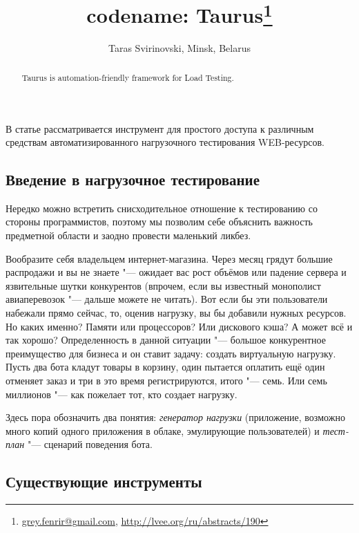 \documentclass[10pt, a5paper]{article}
\begin{document}
\title{codename: Taurus\footnote{\url{grey.fenrir@gmail.com}, \url{http://lvee.org/ru/abstracts/190}}}
\author{Taras Svirinovski, Minsk, Belarus}
\maketitle
\begin{abstract}
Taurus is automation-friendly framework for Load Testing.
\end{abstract}
В статье рассматривается инструмент для простого доступа к различным средствам автоматизированного нагрузочного тестирования WEB-ресурсов.

\subsection*{Введение в нагрузочное тестирование}
Нередко можно встретить снисходительное отношение к тестированию со стороны программистов, поэтому мы позволим себе объяснить важность предметной области и заодно провести маленький ликбез.

Вообразите себя владельцем интернет-магазина. Через месяц грядут большие распродажи и вы не знаете "--- ожидает вас рост объёмов или падение сервера и язвительные шутки конкурентов (впрочем, если вы известный монополист авиаперевозок "--- дальше можете не читать). Вот если бы эти пользователи набежали прямо сейчас, то, оценив нагрузку, вы бы добавили нужных ресурсов. Но каких именно? Памяти или процессоров? Или дискового кэша? А может всё и так хорошо?
Определенность в данной ситуации "--- большое конкурентное преимущество для бизнеса и он ставит задачу: создать виртуальную нагрузку. Пусть два бота кладут товары в корзину, один пытается оплатить ещё один отменяет заказ и три в это время регистрируются, итого "--- семь. Или семь миллионов "--- как пожелает тот, кто создает нагрузку.

Здесь пора обозначить два понятия: \emph{генератор нагрузки} (приложение, возможно много копий одного приложения в облаке, эмулирующие пользователей) и \emph{тест-план} "--- сценарий поведения бота.

\subsection*{Существующие инструменты}
\end{document}
